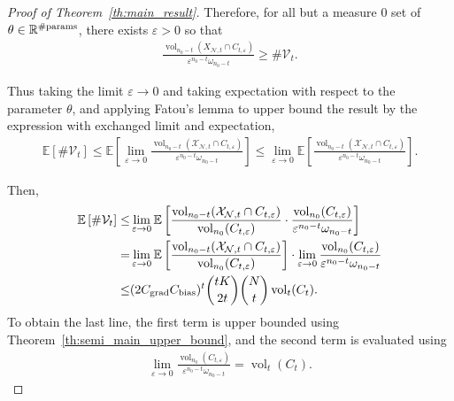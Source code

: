 \documentclass{article}
\theoremstyle{definition}
\newcommand{\cbias}{C_{\text{\normalfont bias}}}
\newcommand{\cgrad}{C_{\text{\normalfont grad}}}
\newcommand{\net}{\mathcal{N}}
\newcommand{\nin}{n_0}
\newcommand{\vol}{\operatorname{vol}}
\begin{document}
\begin{proof}[Proof of Theorem~\ref{th:main_result}]
    Therefore, for all but a measure $0$ set of $\theta \in \mathbb{R}^{\# \text{\normalfont params}}$, there exists $\varepsilon > 0$ so that
    \begin{align*}
        \frac{\vol_{\nin - t}(X_{\net, t} \cap C_{t, \varepsilon})}{\varepsilon^{\nin - t} \omega_{\nin - t}} \geq \# \mathcal{V}_t.
    \end{align*}
    
    Thus taking the limit $\varepsilon \rightarrow 0$ and taking expectation with respect to the parameter $\theta$, and applying Fatou's lemma to upper bound the result by the expression with exchanged limit and expectation, 
    \begin{align*}
         \mathbb{E} \left [ \# \mathcal{V}_t \right ] \leq \mathbb{E} \left[ \lim \limits_{\varepsilon \rightarrow 0} \frac{\vol_{\nin - t}(\mathcal{X}_{\net, t} \cap C_{t, \varepsilon})}{\varepsilon^{\nin - t} \omega_{\nin - t}} \right ] \leq \lim \limits_{\varepsilon \rightarrow 0} \mathbb{E} \left[  \frac{\vol_{\nin - t}(\mathcal{X}_{\net, t} \cap C_{t, \varepsilon})}{\varepsilon^{\nin - t} \omega_{\nin - t}} \right ].
    \end{align*}
    
    Then,
    \begin{align*}
        \mathbb{E} \left [ \# \mathcal{V}_t \right ] \leq &
        \lim \limits_{\varepsilon \rightarrow 0} \mathbb{E} \left[  \frac{\vol_{\nin - t}(\mathcal{X}_{\net, t} \cap C_{t, \varepsilon})}{ \vol_{\nin}(C_{t, \varepsilon})} \cdot \frac{\vol_{\nin}(C_{t, \varepsilon})}{\varepsilon^{\nin - t} \omega_{\nin - t}} \right ]\\
        = &\lim \limits_{\varepsilon \rightarrow 0} \mathbb{E} \left[  \frac{\vol_{\nin - t}(\mathcal{X}_{\net, t} \cap C_{t, \varepsilon})}{ \vol_{\nin}(C_{t, \varepsilon})} \right ] \cdot \lim \limits_{\varepsilon \rightarrow 0}  \frac{\vol_{\nin}(C_{t, \varepsilon})}{\varepsilon^{\nin - t} \omega_{\nin - t}} \\
        \leq& (
        2 \cgrad \cbias)^t \binom{tK}{2t} \binom{N}{t} \vol_t(C_t). 
    \end{align*}
    To obtain the last line, the first term is upper bounded using Theorem~\ref{th:semi_main_upper_bound}, and the second term is evaluated using 
    \begin{align*}
        \lim\limits_{\varepsilon \rightarrow 0} \frac{\vol_{\nin} ( C_{t, \varepsilon}) } {\varepsilon^{\nin - t} \omega_{\nin - t}} = \vol_t (C_t). 
    \end{align*}
    

\end{proof}
\end{document}
